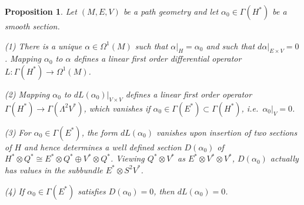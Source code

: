 \documentclass[11pt]{amsart}
\newtheorem{proposition}{Proposition}
\numberwithin{proposition}{section}
\numberwithin{equation}{section}
\begin{document}
\begin{proposition}\label{prop:BGG}
    Let $(M,E,V)$ be a path geometry and let $\alpha_0\in\Gamma(H^*)$ be a smooth section.

    (1) There is a unique $\alpha\in\Omega^1(M)$ such that $\alpha|_H=\alpha_0$ and such that $d\alpha|_{E\times V}=0$. Mapping $\alpha_0$ to $\alpha$ defines a linear first order differential operator $L:\Gamma(H^*)\to\Omega^1(M)$. 

    (2) Mapping $\alpha_0$ to $dL(\alpha_0)|_{V\times V}$ defines a linear first order operator $\Gamma(H^*)\to\Gamma(\Lambda^2V^*)$, which vanishes if $\alpha_0\in\Gamma(E^*)\subset\Gamma(H^*)$, i.e.\ $\alpha_0|_V=0$. 

    (3) For $\alpha_0\in\Gamma(E^*)$, the form $dL(\alpha_0)$ vanishes upon insertion of two sections of $H$ and hence determines a well defined section $D(\alpha_0)$ of $H^*\otimes Q^*\cong E^*\otimes Q^*\oplus V^*\otimes Q^*$. Viewing $Q^*\otimes V^*$ as $E^*\otimes V^*\otimes V^*$, $D(\alpha_0)$ actually has values in the subbundle $E^*\otimes S^2V^*$. 

    (4) If $\alpha_0\in\Gamma(E^*)$ satisfies $D(\alpha_0)=0$, then $dL(\alpha_0)=0$.  
\end{proposition}
\end{document}
